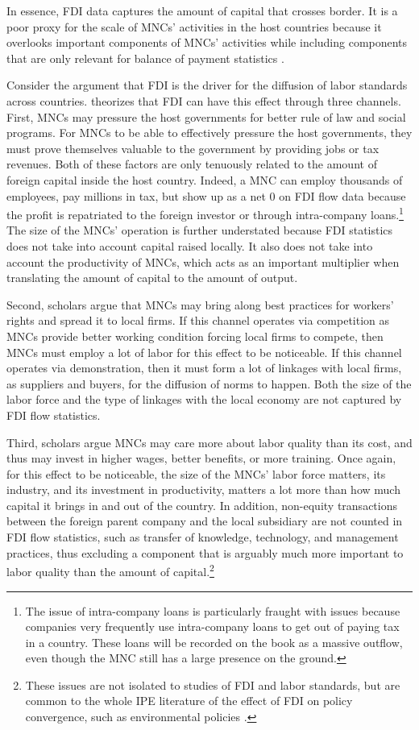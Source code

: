 In essence, FDI data captures the amount of capital that crosses border. It is a
poor proxy for the scale of MNCs' activities in the host countries because it
overlooks important components of MNCs' activities while including components
that are only relevant for balance of payment statistics
\citep{Beugelsdijk2010}.

Consider the argument that FDI is the driver for the diffusion of labor
standards across countries. \citet{Mosley2007} theorizes that FDI can have this
effect through three channels. First, MNCs may pressure the host governments for
better rule of law and social programs. For MNCs to be able to effectively
pressure the host governments, they must prove themselves valuable to the
government by providing jobs or tax revenues. Both of these factors are only
tenuously related to the amount of foreign capital inside the host country.
Indeed, a MNC can employ thousands of employees, pay millions in tax, but show
up as a net 0 on FDI flow data because the profit is repatriated to the foreign
investor or through intra-company loans.\footnote{The issue of intra-company
loans is particularly fraught with issues because companies very frequently use
intra-company loans to get out of paying tax in a country. These loans will be
recorded on the book as a massive outflow, even though the MNC still has a large
presence on the ground.} The size of the MNCs' operation is further understated
because FDI statistics does not take into account capital raised locally. It
also does not take into account the productivity of MNCs, which acts as an
important multiplier when translating the amount of capital to the amount of
output.

Second, scholars argue that MNCs may bring along best practices for workers'
rights and spread it to local firms. If this channel operates via competition as
MNCs provide better working condition forcing local firms to compete, then MNCs
must employ a lot of labor for this effect to be noticeable. If this channel
operates via demonstration, then it must form a lot of linkages with local
firms, as suppliers and buyers, for the diffusion of norms to happen. Both the
size of the labor force and the type of linkages with the local economy are not
captured by FDI flow statistics.

Third, scholars argue MNCs may care more about labor quality than its cost, and
thus may invest in higher wages, better benefits, or more training. Once again,
for this effect to be noticeable, the size of the MNCs' labor force matters, its
industry, and its investment in productivity, matters a lot more than how much
capital it brings in and out of the country. In addition, non-equity
transactions between the foreign parent company and the local subsidiary are not
counted in FDI flow statistics, such as transfer of knowledge, technology, and
management practices, thus excluding a component that is arguably much more
important to labor quality than the amount of capital.\footnote{These issues are
not isolated to studies of FDI and labor standards, but are common to the whole
IPE literature of the effect of FDI on policy convergence, such as environmental
policies \citep{Prakash2007}.}

